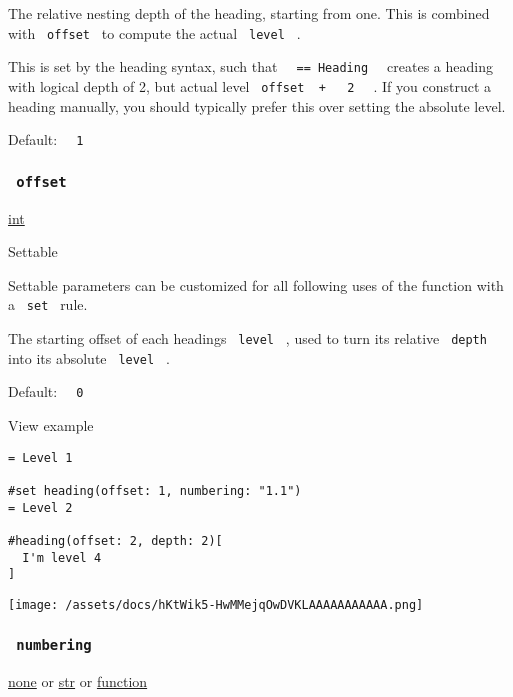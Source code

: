 The relative nesting depth of the heading, starting from one. This is
combined with \texttt{\ offset\ } to compute the actual
\texttt{\ level\ } .

This is set by the heading syntax, such that
\texttt{\ }{\texttt{\ ==\ Heading\ }}\texttt{\ } creates a heading with
logical depth of 2, but actual level
\texttt{\ offset\ }{\texttt{\ +\ }}\texttt{\ }{\texttt{\ 2\ }}\texttt{\ }
. If you construct a heading manually, you should typically prefer this
over setting the absolute level.

Default: \texttt{\ }{\texttt{\ 1\ }}\texttt{\ }

\subsubsection{\texorpdfstring{\texttt{\ offset\ }}{ offset }}\label{parameters-offset}

\href{/docs/reference/foundations/int/}{int}

{{ Settable }}

\label{parameters-offset-settable-tooltip}
Settable parameters can be customized for all following uses of the
function with a \texttt{\ set\ } rule.

The starting offset of each heading\textquotesingle s \texttt{\ level\ }
, used to turn its relative \texttt{\ depth\ } into its absolute
\texttt{\ level\ } .

Default: \texttt{\ }{\texttt{\ 0\ }}\texttt{\ }


View example

\begin{verbatim}
= Level 1

#set heading(offset: 1, numbering: "1.1")
= Level 2

#heading(offset: 2, depth: 2)[
  I'm level 4
]
\end{verbatim}

\texttt{[image: /assets/docs/hKtWik5-HwMMejqOwDVKLAAAAAAAAAAA.png]}

\subsubsection{\texorpdfstring{\texttt{\ numbering\ }}{ numbering }}\label{parameters-numbering}

\href{/docs/reference/foundations/none/}{none} {or}
\href{/docs/reference/foundations/str/}{str} {or}
\href{/docs/reference/foundations/function/}{function}

